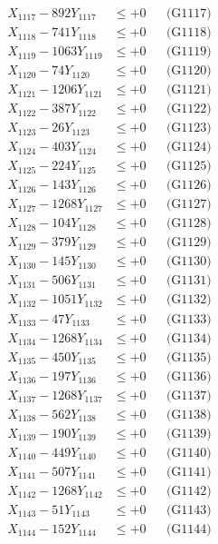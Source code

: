 \documentclass[a4paper,10pt]{article}
\begin{document}
{\begin{align}
X_{1117} - 892Y_{1117} &\leq +0 && \text{(G1117)} \\
X_{1118} - 741Y_{1118} &\leq +0 && \text{(G1118)} \\
X_{1119} - 1063Y_{1119} &\leq +0 && \text{(G1119)} \\
X_{1120} - 74Y_{1120} &\leq +0 && \text{(G1120)} \\
\allowbreak
X_{1121} - 1206Y_{1121} &\leq +0 && \text{(G1121)} \\
X_{1122} - 387Y_{1122} &\leq +0 && \text{(G1122)} \\
X_{1123} - 26Y_{1123} &\leq +0 && \text{(G1123)} \\
X_{1124} - 403Y_{1124} &\leq +0 && \text{(G1124)} \\
X_{1125} - 224Y_{1125} &\leq +0 && \text{(G1125)} \\
X_{1126} - 143Y_{1126} &\leq +0 && \text{(G1126)} \\
X_{1127} - 1268Y_{1127} &\leq +0 && \text{(G1127)} \\
X_{1128} - 104Y_{1128} &\leq +0 && \text{(G1128)} \\
X_{1129} - 379Y_{1129} &\leq +0 && \text{(G1129)} \\
X_{1130} - 145Y_{1130} &\leq +0 && \text{(G1130)} \\
\allowbreak
X_{1131} - 506Y_{1131} &\leq +0 && \text{(G1131)} \\
X_{1132} - 1051Y_{1132} &\leq +0 && \text{(G1132)} \\
X_{1133} - 47Y_{1133} &\leq +0 && \text{(G1133)} \\
X_{1134} - 1268Y_{1134} &\leq +0 && \text{(G1134)} \\
X_{1135} - 450Y_{1135} &\leq +0 && \text{(G1135)} \\
X_{1136} - 197Y_{1136} &\leq +0 && \text{(G1136)} \\
X_{1137} - 1268Y_{1137} &\leq +0 && \text{(G1137)} \\
X_{1138} - 562Y_{1138} &\leq +0 && \text{(G1138)} \\
X_{1139} - 190Y_{1139} &\leq +0 && \text{(G1139)} \\
X_{1140} - 449Y_{1140} &\leq +0 && \text{(G1140)} \\
\allowbreak
X_{1141} - 507Y_{1141} &\leq +0 && \text{(G1141)} \\
X_{1142} - 1268Y_{1142} &\leq +0 && \text{(G1142)} \\
X_{1143} - 51Y_{1143} &\leq +0 && \text{(G1143)} \\
X_{1144} - 152Y_{1144} &\leq +0 && \text{(G1144)} \\

\end{align}}
\end{document}
